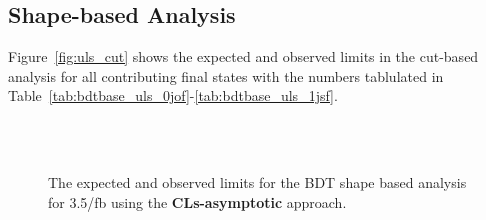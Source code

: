 \subsection{Shape-based Analysis}
Figure~\ref{fig:uls_cut} shows the expected and observed limits in the cut-based analysis 
for all contributing final states with the numbers tablulated in Table~\ref{tab:bdtbase_uls_0jof}-\ref{tab:bdtbase_uls_1jsf}. 


\begin{figure}[!hbtp]
\centering
{}
\centering
{} \\
 \\
\label{fig:uls_shape}
\caption{The expected and observed limits for the BDT shape based analysis for 3.5/fb using the {\bf CLs-asymptotic} approach. }
\end{figure}

